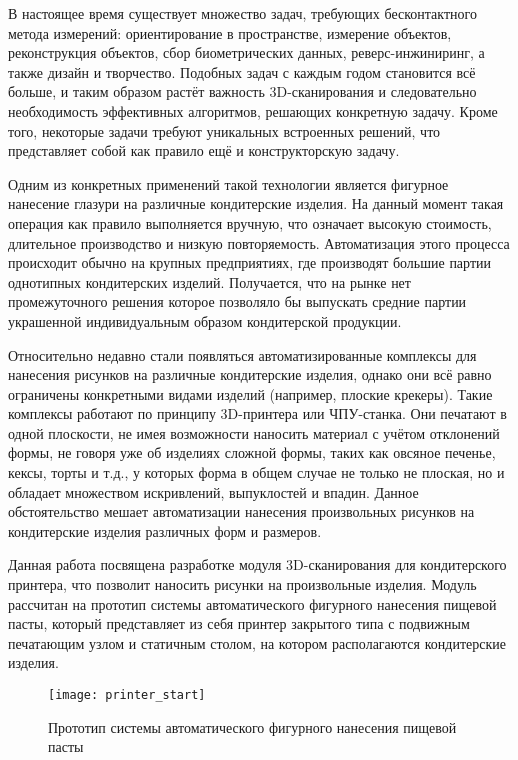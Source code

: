 \intro
В настоящее время существует множество задач, требующих бесконтактного метода измерений: ориентирование в пространстве, измерение объектов, реконструкция объектов, сбор биометрических данных, реверс-инжиниринг, а также дизайн и творчество. Подобных задач с каждым годом становится всё больше, и таким образом растёт важность 3D-сканирования и следовательно необходимость эффективных алгоритмов, решающих конкретную задачу. Кроме того, некоторые задачи требуют уникальных встроенных решений, что представляет собой как правило ещё и конструкторскую задачу.

Одним из конкретных применений такой технологии является фигурное нанесение глазури на различные кондитерские изделия. На данный момент такая операция как правило выполняется вручную, что означает высокую стоимость, длительное производство и низкую повторяемость. Автоматизация этого процесса происходит обычно на крупных предприятиях, где производят большие партии однотипных кондитерских изделий. Получается, что на рынке нет промежуточного решения которое позволяло бы выпускать средние партии украшенной индивидуальным образом кондитерской продукции.

Относительно недавно стали появляться автоматизированные комплексы для нанесения рисунков на различные кондитерские изделия, однако они всё равно ограничены конкретными видами изделий (например, плоские крекеры). Такие комплексы работают по принципу 3D-принтера или ЧПУ-станка. Они печатают в одной плоскости, не имея возможности наносить материал с учётом отклонений формы, не говоря уже об изделиях сложной формы, таких как овсяное печенье, кексы, торты и т.д., у которых форма в общем случае не только не плоская, но и обладает множеством искривлений, выпуклостей и впадин. Данное обстоятельство мешает автоматизации нанесения произвольных рисунков на кондитерские изделия различных форм и размеров.

Данная работа посвящена разработке модуля 3D-сканирования для кондитерского принтера, что позволит наносить рисунки на произвольные изделия. Модуль рассчитан на прототип системы автоматического фигурного нанесения пищевой пасты, который представляет из себя принтер закрытого типа с подвижным печатающим узлом и статичным столом, на котором располагаются кондитерские изделия.

\begin{figure}[!ht]\label{pic:printer_start}
    \centering
    \texttt{[image: printer\_start]}
    \caption{Прототип системы автоматического фигурного нанесения пищевой пасты}
\end{figure}

